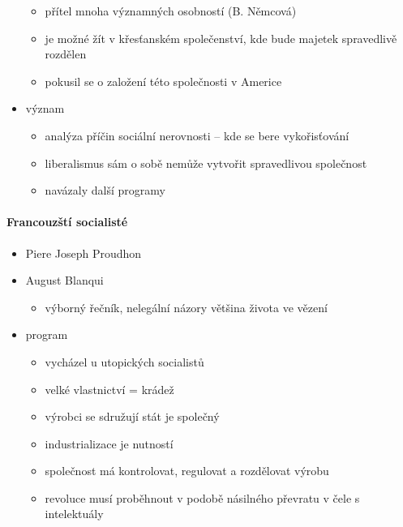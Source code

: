 \begin{itemize}
\begin{itemize}
	\item přítel mnoha významných osobností (B. Němcová)
	\item je možné žít v křesťanském společenství, kde bude majetek spravedlivě rozdělen
	\item pokusil se o založení této společnosti v Americe
	\end{itemize}
\item význam
	\begin{itemize}
	\item analýza příčin sociální nerovnosti -- kde se bere vykořisťování
	\item liberalismus sám o sobě nemůže vytvořit spravedlivou společnost
	\item navázaly další programy
	\end{itemize}
\end{itemize}

\paragraph{Francouzští socialisté}
\begin{itemize}
\item Piere Joseph Proudhon
\item August Blanqui
	\begin{itemize}
	\item výborný řečník, nelegální názory \ra většina života ve vězení
	\end{itemize}
\item program
	\begin{itemize}
	\item vycházel u utopických socialistů
	\item velké vlastnictví = krádež
	\item výrobci se sdružují \ra stát je společný
	\item industrializace je nutností
	\item společnost má kontrolovat, regulovat a rozdělovat výrobu 
	\item revoluce musí proběhnout v podobě násilného převratu v čele s intelektuály
	\end{itemize}
\end{itemize}

